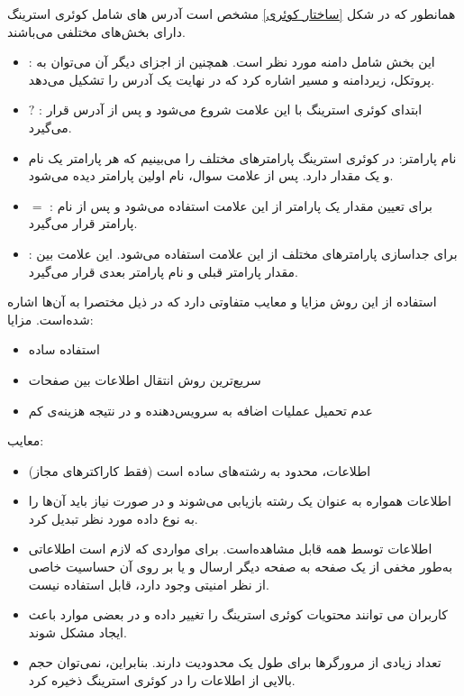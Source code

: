 همانطور که در شکل
\ref{ساختار کوئری}
مشخص است آدرس های شامل کوئری استرینگ دارای بخش‌های مختلفی می‌باشند.
\begin{itemize}
	\item 
	 : این بخش شامل دامنه مورد نظر است. همچنین از اجزای دیگر آن می‌توان به پروتکل، زیردامنه و مسیر اشاره کرد که در نهایت یک آدرس را تشکیل می‌دهد.
	\item
	$?$ : ابتدای کوئری استرینگ با این علامت شروع می‌شود و پس از آدرس قرار می‌گیرد.
	\item
	نام پارامتر: در کوئری استرینگ پارامترهای مختلف را می‌بینیم که هر پارامتر یک نام
	\noindent\unskip{}
	و یک مقدار
	\noindent\unskip{}
	دارد. پس از علامت سوال، نام اولین پارامتر دیده می‌شود.
	\item
	$=$ : برای تعیین مقدار یک پارامتر از این علامت استفاده می‌شود و پس از نام پارامتر قرار می‌گیرد.
	\item
	\lr{\&} : برای جداسازی پارامتر‌های مختلف از این علامت استفاده می‌شود. این علامت بین مقدار پارامتر قبلی و نام پارامتر بعدی قرار می‌گیرد.
\end{itemize}
\newpage
استفاده از این روش مزایا و معایب متفاوتی دارد که در ذیل مختصرا به آن‌ها اشاره شده‌است.
\cite{QueryString}
مزایا:
\begin{itemize}
	
	\item
	استفاده ساده
	\item
	سریع‌ترین روش انتقال اطلاعات بين صفحات
	\item
	عدم تحميل عمليات اضافه به سرويس‌دهنده و در نتیجه هزینه‌ی کم
\end{itemize}

معایب:
\begin{itemize}
	
	\item
	اطلاعات، محدود به رشته‌های ساده است (فقط کاراکترهای مجاز)
	\item
	اطلاعات همواره به عنوان يک رشته بازيابی می‌شوند و در صورت نياز باید آن‌ها را به نوع داده مورد نظر تبديل كرد.
	\item
	اطلاعات توسط همه قابل مشاهده‌است. برای مواردی که لازم است اطلاعاتی به‌طور مخفی از يک صفحه به صفحه ديگر ارسال و يا بر روی آن حساسيت خاصی از نظر امنيتی وجود دارد، قابل استفاده نیست.
	\item
	كاربران می توانند محتويات کوئری استرینگ را تغيير داده و در بعضی موارد باعث ایجاد مشکل شوند.
	\item
	تعداد زيادی از مرورگرها برای طول یک
	محدودیت دارند. بنابراين، نمی‌توان حجم بالایی از اطلاعات را در کوئری استرینگ ذخيره كرد.
\end{itemize}

